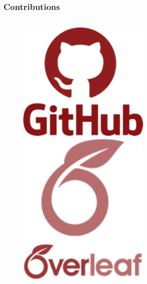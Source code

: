 \documentclass[ignorenonframetext, 8pt, allowframebreaks]{beamer}
\begin{document}
\begin{frame}
 \frametitle{Contributions}
\begin{columns}
		\begin{column}{0.2\textwidth}

 					\begin{figure}
  						  \centering
   						 \includegraphics[width=0.6\textwidth]{../Tex/Contribute/ContribPictures/github.pdf}\\
   						 	 \includegraphics[width=0.6\textwidth]{../Tex//Contribute/ContribPictures/overleaf.pdf}
				  \end{figure}
		\end{column}
		\begin{column}{0.8\textwidth}
							
		\end{column}
\end{columns}

 \end{frame}
 
 
\end{document}
